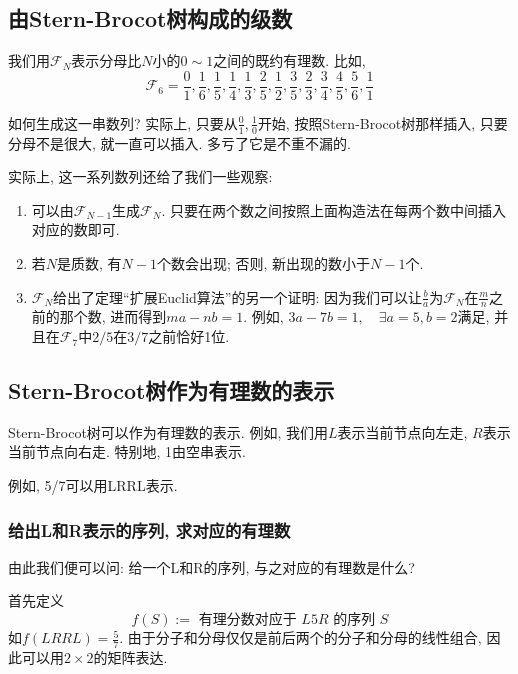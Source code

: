 \documentclass{ctexart}
\begin{document}
\subsection{由Stern-Brocot树构成的级数} 我们用$\mathcal F_N$表示分母比$N$小的$0\sim 1$之间的既约有理数. 比如,$$\mathcal F_6=\frac{0}{1}, \frac{1}{6}, \frac{1}{5}, \frac{1}{4}, \frac{1}{3}, \frac{2}{5}, \frac{1}{2}, \frac{3}{5}, \frac{2}{3}, \frac{3}{4}, \frac{4}{5}, \frac{5}{6}, \frac{1}{1}$$

如何生成这一串数列? 实际上, 只要从$\frac{0}{1}, \frac{1}{0}$开始, 按照Stern-Brocot树那样插入, 只要分母不是很大, 就一直可以插入. 多亏了它是不重不漏的.

实际上, 这一系列数列还给了我们一些观察: 

\begin{enumerate}
    \item 可以由$\mathcal F_{N-1}$生成$\mathcal F_N$. 只要在两个数之间按照上面构造法在每两个数中间插入对应的数即可.
    \item 若$N$是质数, 有$N-1$个数会出现; 否则, 新出现的数小于$N-1$个. 
    \item $\mathcal F_N$给出了定理``扩展Euclid算法''的另一个证明: 因为我们可以让$\frac{b}{a}$为$\mathcal F_N$在$\frac{m}{n}$之前的那个数, 进而得到$m a-n b=1$. 例如, $3 a-7 b=1, \quad \exists a=5, b=2$满足, 并且在$\mathcal F_7$中$2/5$在$3/7$之前恰好1位. 
\end{enumerate}

\subsection{Stern-Brocot树作为有理数的表示} Stern-Brocot树可以作为有理数的表示. 例如, 我们用$L$表示当前节点向左走,  $R$表示当前节点向右走. 特别地, 1由空串表示. 

\begin{example}
    例如, 5/7可以用LRRL表示. 
    
\end{example}

\subsubsection{给出L和R表示的序列, 求对应的有理数}

由此我们便可以问: 给一个L和R的序列, 与之对应的有理数是什么?

首先定义
$$
f(S):=\text { 有理分数对应于 } L 5 R \text { 的序列 } S
$$
如$f(L R R L)=\frac{5}{7}$.
由于分子和分母仅仅是前后两个的分子和分母的线性组合, 因此可以用$2 \times  2$的矩阵表达. 
\end{document}
